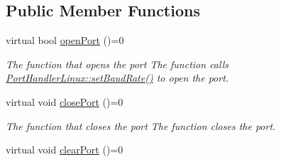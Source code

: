 \subsection*{Public Member Functions}
\begin{DoxyCompactItemize}
\item 
virtual bool \hyperlink{classmercury_1_1_port_handler_a5f65f9a73969cc170582da2d0e11f510}{open\+Port} ()=0
\begin{DoxyCompactList}\small\item\em The function that opens the port  The function calls \hyperlink{classmercury_1_1_port_handler_linux_a31c5d6a569cec58d20f9041f100a637c}{Port\+Handler\+Linux\+::set\+Baud\+Rate()} to open the port. \end{DoxyCompactList}\item 
virtual void \hyperlink{classmercury_1_1_port_handler_ae23da4458668b517e96ee6f572ad3564}{close\+Port} ()=0\hypertarget{classmercury_1_1_port_handler_ae23da4458668b517e96ee6f572ad3564}{}\label{classmercury_1_1_port_handler_ae23da4458668b517e96ee6f572ad3564}

\begin{DoxyCompactList}\small\item\em The function that closes the port  The function closes the port. \end{DoxyCompactList}\item 
virtual void \hyperlink{classmercury_1_1_port_handler_accf37c8838c1ce3042a0127ceeb89c48}{clear\+Port} ()=0\hypertarget{classmercury_1_1_port_handler_accf37c8838c1ce3042a0127ceeb89c48}{}\label{classmercury_1_1_port_handler_accf37c8838c1ce3042a0127ceeb89c48}


\end{DoxyCompactItemize}
